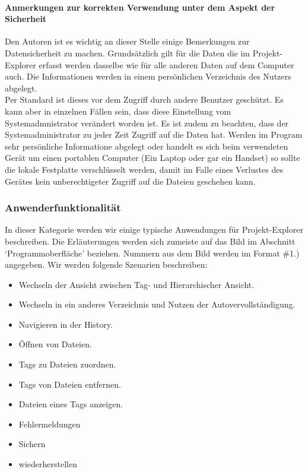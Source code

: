 \documentclass[10pt,paper=a4,final]{scrartcl}
\begin{document}
\paragraph{Anmerkungen zur korrekten Verwendung unter dem Aspekt der Sicherheit}
Den Autoren ist es wichtig an dieser Stelle einige Bemerkungen zur Datensicherheit zu machen.
Grunds\"atzlich gilt f\"ur die Daten die im Projekt-Explorer erfasst werden dasselbe wie f\"ur alle anderen Daten auf dem Computer auch. Die Informationen werden in einem pers\"onlichen Verzeichnis des Nutzers abgelegt.\\
Per Standard ist dieses vor dem Zugriff durch andere Benutzer gesch\"utzt. Es kann aber in einzelnen F\"allen sein, dass diese Einstellung vom Systemadmnistrator ver\"andert worden ist.
Es ist zudem zu beachten, dass der Systemadministrator zu jeder Zeit Zugriff auf die Daten hat.
Werden im Program sehr pers\"onliche Informatione abgelegt oder handelt es sich beim verwendeten Ger\"at um einen portablen Computer (Ein Laptop oder gar ein Handset) so sollte die lokale Festplatte verschl\"usselt werden, damit im Falle eines Verlustes des Ger\"ates kein unberechtigeter Zugriff auf die Dateien geschehen kann.
\subsubsection{Anwenderfunktionalit\"at}
In dieser Kategorie werden wir einige typische Anwendungen f\"ur Projekt-Explorer beschreiben. Die Erl\"auterungen werden sich zumeiste auf das Bild im Abschnitt ‘Programmoberfl\"ache’ beziehen. Nummern aus dem Bild werden im Format \#1.) angegeben.
Wir werden folgende Szenarien beschreiben:
\begin{itemize}
  \item Wechseln der Ansicht zwischen Tag- und Hierarchischer Ansicht.
  \item Wechseln in ein anderes Verzeichnis und Nutzen der Autovervollst\"andigung.
  \item Navigieren in der History.
  \item \"Offnen von Dateien.
  \item Tags zu Dateien zuordnen.
  \item Tags von Dateien entfernen.
  \item Dateien eines Tags anzeigen.
  \item Fehlermeldungen
  \item Sichern
  \item wiederherstellen
\end{itemize}
\end{document}
